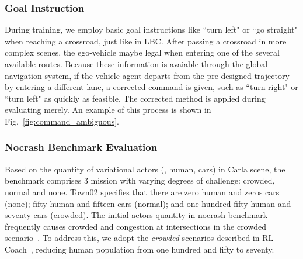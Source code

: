 \subsubsection{Goal Instruction} 
\hspace{1pc}During training, we employ basic goal instructions like ``turn left" or ``go straight" when reaching a crossroad, just like in LBC\cite{Codevilla:2019}.
After passing a crossroad in more complex scenes, the ego-vehicle maybe legal when entering one of the several available routes. 
Because these information is avaiable through the global navigation system, if the vehicle agent departs from the pre-designed trajectory by entering a different lane, a corrected command is given, such as ``turn right" or ``turn left" as quickly as feasible. 
The corrected method is applied during evaluating merely.
An example of this process is shown in Fig.~\ref{fig:command_ambiguous}.


\subsubsection{Nocrash Benchmark Evaluation}\label{nocrash_metrics}

\hspace{1pc}Based on the quantity of variational actors ({\ie}, human, cars) in Carla scene, the benchmark comprises 3 mission with varying degrees of challenge: crowded, normal and none.
Town02 specifies that there are zero human and zeros cars (none); fifty human and fifteen cars (normal); and one hundred fifty human and seventy cars (crowded).
%
The initial actors quantity in nocrash benchmark frequently causes crowded and congestion at intersections in the crowded scenario~\cite{Zhang:2021}.
To address this, we adopt the \emph{crowded} scenarios described in RL-Coach~\cite{Zhang:2021}, reducing human population from one hundred and fifty to seventy. 


